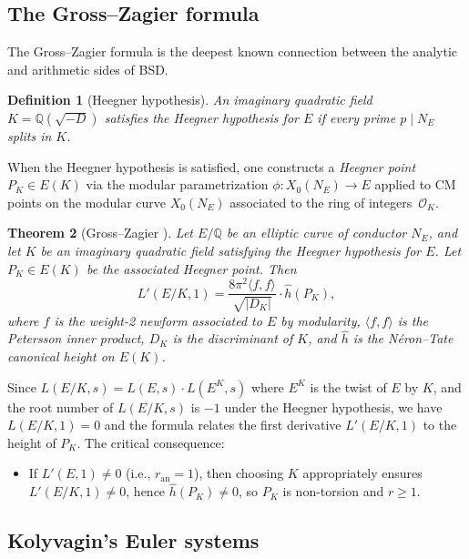\documentclass[11pt]{article}
\newtheorem{theorem}{Theorem}[section]
\newtheorem{definition}[theorem]{Definition}
\begin{document}
\subsection{The Gross--Zagier formula}

The Gross--Zagier formula is the deepest known connection between the analytic
and arithmetic sides of BSD.

\begin{definition}[Heegner hypothesis]
An imaginary quadratic field $K = \mathbb{Q}(\sqrt{-D})$ satisfies the
\emph{Heegner hypothesis} for $E$ if every prime $p \mid N_E$ splits in $K$.
\end{definition}

\noindent
When the Heegner hypothesis is satisfied, one constructs a \emph{Heegner point}
$P_K \in E(K)$ via the modular parametrization $\phi : X_0(N_E) \to E$ applied
to CM points on the modular curve $X_0(N_E)$ associated to the ring of
integers~$\mathcal{O}_K$.

\begin{theorem}[Gross--Zagier \cite{GZ}]
\label{thm:gross-zagier}
Let $E/\mathbb{Q}$ be an elliptic curve of conductor $N_E$, and let $K$ be an
imaginary quadratic field satisfying the Heegner hypothesis for $E$.  Let
$P_K \in E(K)$ be the associated Heegner point.  Then
\[
  L'(E/K, 1) = \frac{8\pi^2 \langle f, f \rangle}{\sqrt{|D_K|}} \cdot \hat{h}(P_K),
\]
where $f$ is the weight-2 newform associated to $E$ by modularity,
$\langle f, f \rangle$ is the Petersson inner product, $D_K$ is the discriminant
of $K$, and $\hat{h}$ is the N\'eron--Tate canonical height on $E(K)$.
\end{theorem}

\noindent
Since $L(E/K, s) = L(E, s) \cdot L(E^K, s)$ where $E^K$ is the twist of $E$
by $K$, and the root number of $L(E/K, s)$ is $-1$ under the Heegner
hypothesis, we have $L(E/K, 1) = 0$ and the formula relates the first
derivative $L'(E/K, 1)$ to the height of $P_K$.  The critical consequence:
\begin{itemize}
  \item If $L'(E,1) \neq 0$ (i.e., $r_{\mathrm{an}} = 1$), then choosing $K$
    appropriately ensures $L'(E/K, 1) \neq 0$, hence $\hat{h}(P_K) \neq 0$,
    so $P_K$ is non-torsion and $r \geq 1$.
\end{itemize}

\subsection{Kolyvagin's Euler systems}
\end{document}

